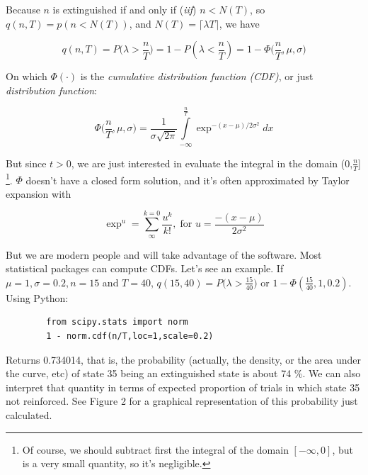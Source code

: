 \documentclass[11pt]{article}
\begin{document}
Because $n$ is extinguished if and only if (\textit{iif}) $n < N(T)$, so $q(n,T) = p(n < N(T))$,
and $N(T) = \lceil \lambda T \rceil$, we have

    \[
        q(n,T) = P \Big(\lambda > \frac{n}{T}\Big) = 1 - P(\lambda < \frac{n}{T}) = 1 - \Phi \Big (\frac{n}{T}, \mu, \sigma \Big)
    \]


On which $\Phi (\cdot)$ is the \textit{cumulative distribution function (CDF)}, or just \textit{distribution function}:

    \[
        \Phi \Big( \frac{n}{T}, \mu, \sigma \Big) = \frac{1}{\sigma \sqrt{2 \pi}} \int\limits_{-\infty}^{\frac{n}{T}} \exp^{-(x - \mu)/2\sigma^2}dx
    \]

But since $t > 0$, we are just interested in evaluate the integral in the domain (0,$\frac{n}{T}$] \footnote{Of course,
    we should subtract first the integral of the domain $[-\infty, 0]$, but is a very small quantity, so it's negligible.}.
$\Phi$ doesn't have a closed form solution, and it's often approximated by Taylor expansion with

    \[
        \exp^{u} = \sum^{k=0}_{\infty} \frac{u^k}{k!}, \; \text{for } u = \frac{-(x - \mu)}{2 \sigma^2}
    \]

But we are modern people and will take advantage of the software.
Most statistical packages can compute CDFs.
Let's see an example.
If $\mu = 1, \sigma = 0.2, n = 15$
and $T = 40$, $q(15,40) = P \Big( \lambda > \frac{15}{40} \Big)$ or $1 - \Phi(\frac{15}{40},1,0.2)$. Using \textsf{Python}:

    \begin{verbatim}
        from scipy.stats import norm
        1 - norm.cdf(n/T,loc=1,scale=0.2)
    \end{verbatim}

Returns 0.734014, that is, the probability (actually, the density, or the area under the curve, etc) of state 35 being an
    extinguished state is about 74 \%.
    We can also interpret that quantity in terms of expected proportion of trials in which state 35 not reinforced.
    See Figure 2 for a graphical representation of this probability just calculated.
\end{document}
